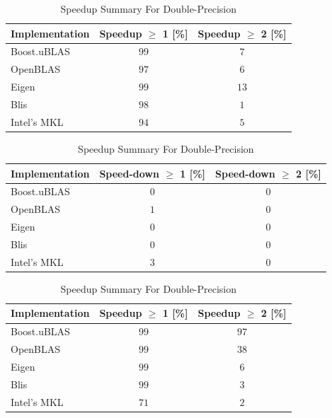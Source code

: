 \begin{table}[ht]
    \centering
    \caption{Speedup Summary For Single-Precision}
    \begin{tabular}{|l|c|c|}
        \hline
        \textbf{Implementation} & \textbf{Speedup $\geq$ 1 [\%]} & \textbf{Speedup $\geq$ 2 [\%]}\\
        \hline
        Boost.uBLAS & $99$ & $7$ \\
        \hline
        OpenBLAS    & $97$ & $6$ \\
        \hline
        Eigen       & $99$ & $13$ \\
        \hline
        Blis        & $98$ & $1$ \\
        \hline
        Intel's MKL & $94$ & $5$ \\
        \hline
    \end{tabular}

    \begin{tabular}{|l|c|c|}
        \hline
        \textbf{Implementation} & \textbf{Speed-down $\geq$ 1 [\%]} & \textbf{Speed-down $\geq$ 2 [\%]}\\
        \hline
        Boost.uBLAS & $0$ & $0$ \\
        \hline
        OpenBLAS    & $1$ & $0$ \\
        \hline
        Eigen       & $0$ & $0$ \\
        \hline
        Blis        & $0$ & $0$ \\
        \hline
        Intel's MKL & $3$ & $0$ \\
        \hline
    \end{tabular}

    \vspace*{1 cm}

    \centering
    \caption{Speedup Summary For Double-Precision}
    \begin{tabular}{|l|c|c|}
        \hline
        \textbf{Implementation} & \textbf{Speedup $\geq$ 1 [\%]} & \textbf{Speedup $\geq$ 2 [\%]}\\
        \hline
        Boost.uBLAS & $99$ & $97$ \\
        \hline
        OpenBLAS    & $99$ & $38$ \\
        \hline
        Eigen       & $99$ & $6$ \\
        \hline
        Blis        & $99$ & $3$ \\
        \hline
        Intel's MKL & $71$ & $2$ \\
        \hline
    \end{tabular}


\end{table}
